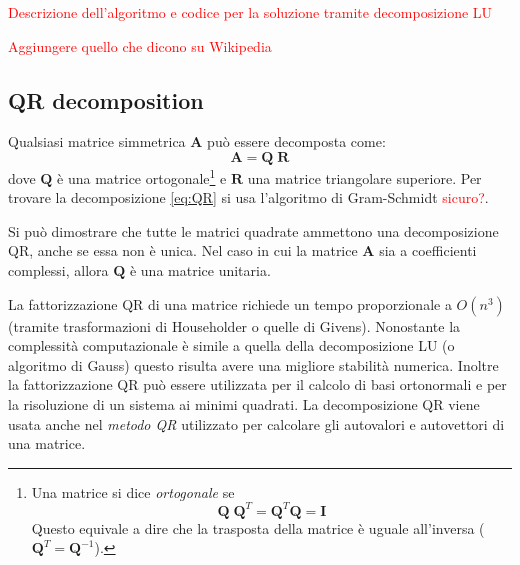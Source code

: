\documentclass[10pt]{article}
\begin{document}
\textcolor{red}{Descrizione dell'algoritmo e codice per la soluzione tramite decomposizione LU}

\textcolor{red}{Aggiungere quello che dicono su Wikipedia}

\subsection{QR decomposition}

Qualsiasi matrice simmetrica $\mathbf{A}$ può essere decomposta come:
\begin{equation}
\mathbf{A} = \mathbf{Q} \; \mathbf{R}
\label{eq:QR}
\end{equation}
dove $\mathbf{Q}$ è una matrice ortogonale\footnote{Una matrice si dice \emph{ortogonale} se
\begin{equation}
\mathbf{Q}\;\mathbf{Q}^T = \mathbf{Q}^T\mathbf{Q} = \mathbf{I}
\end{equation}
Questo equivale a dire che la trasposta della matrice è uguale all'inversa ($\mathbf{Q}^T=\mathbf{Q}^{-1}$).} e $\mathbf{R}$ una matrice triangolare superiore.
Per trovare la decomposizione \eqref{eq:QR} si usa l'algoritmo di Gram-Schmidt \textcolor{red}{sicuro?}.

Si può dimostrare che tutte le matrici quadrate ammettono una decomposizione QR, anche se essa non è unica. Nel caso in cui la matrice $\mathbf{A}$ sia a coefficienti complessi, allora $\mathbf{Q}$ è una matrice unitaria.

La fattorizzazione QR di una matrice richiede un tempo proporzionale a $O(n^3)$ (tramite trasformazioni di Householder o quelle di Givens). Nonostante la complessità computazionale è simile a quella della decomposizione LU (o algoritmo di Gauss) questo risulta avere una migliore stabilità numerica.
Inoltre la fattorizzazione QR può essere utilizzata per il calcolo di basi ortonormali e per la risoluzione di un sistema ai minimi quadrati. La decomposizione QR viene usata anche nel \textit{metodo QR} utilizzato per calcolare gli autovalori e autovettori di una matrice.
\end{document}
